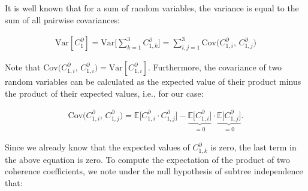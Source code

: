 \medskip

It is well known that for a sum of random variables, the variance is equal to the sum of all pairwise covariances: 

\begin{align*}
    \mathrm{Var}[C^\partial_1] = \mathrm{Var}\Big[\sum_{k=1}^3 C_{1,k}^\partial\Big] = \sum_{i,j=1}^3 \mathrm{Cov}\big(C_{1,i}^\partial,\,C_{1,j}^\partial\big)
\end{align*}

Note that $\mathrm{Cov}\big(C_{1,i}^\partial,\,C_{1,i}^\partial\big) = \mathrm{Var}[C^\partial_{1,i}]$.  Furthermore,  the covariance of two random variables can be calculated as the expected value of their product minus the product of their expected values, i.e., for our case:

\begin{align*}
    \mathrm{Cov}\big(C_{1,i}^\partial,\,C_{1,j}^\partial\big) = \mathbb{E}\big[C_{1,i}^\partial\cdot C_{1,j}^\partial\big] - \underbrace{\mathbb{E}\big[C_{1,i}^\partial\big]}_{=0}\cdot \underbrace{\mathbb{E}\big[C_{1,j}^\partial\big]}_{=0}.
\end{align*}

Since we already know that the expected values of $C_{1,k}^\partial$ is zero, the last term in the above equation is zero. %
To compute the expectation of the product of two coherence coefficients, we note under the null hypothesis of subtree independence that:

